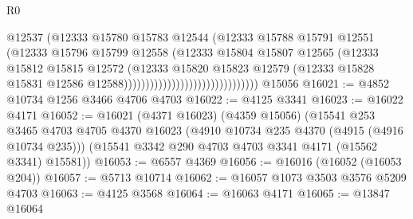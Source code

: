 \begin{lexlean}{R0}
\begin{coremodule}
                                                    @12537
                                                    (@12333
                                                      @15780
                                                      @15783
                                                      @12544
                                                      (@12333
                                                        @15788
                                                        @15791
                                                        @12551
                                                        (@12333
                                                          @15796
                                                          @15799
                                                          @12558
                                                          (@12333
                                                            @15804
                                                            @15807
                                                            @12565
                                                            (@12333
                                                              @15812
                                                              @15815
                                                              @12572
                                                              (@12333
                                                                @15820
                                                                @15823
                                                                @12579
                                                                (@12333
                                                                  @15828
                                                                  @15831
                                                                  @12586
                                                                  @12588)))))))))))))))))))))))))))))))
    @15056
@16021 := @4852 @10734 @1256 @3466 @4706 @4703
@16022 := @4125 @3341
@16023 := @16022 @4171
@16052 := @16021
    (@4371 @16023)
    (@4359 @15056)
    (@15541
      @253
      @3465
      @4703
      @4705
      @4370
      @16023
      (@4910 @10734 @235 @4370 (@4915 (@4916 @10734 @235)))
      (@15541 @3342 @290 @4703 @4703 @3341 @4171 (@15562 @3341) @15581))
@16053 := @6557 @4369
@16056 := @16016 (@16052 (@16053 @204))
@16057 := @5713 @10714
@16062 := @16057 @1073 @3503 @3576 @5209 @4703
@16063 := @4125 @3568
@16064 := @16063 @4171
@16065 := @13847 @16064

\end{coremodule}
\end{lexlean}

